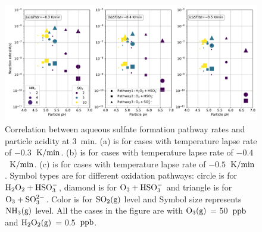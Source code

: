 \documentclass[edeposit,fullpage]{uiucthesis2009}
\makeatletter
\DeclareRobustCommand*\unit[1]
 {\ensuremath{%
   {\thinmuskip3mu\relax
    \def\mu{\text{\textmu}}\def~{\,}%
    \ifx\f@series\testbx\mathbf{#1}\else\mathrm{#1}\fi}}}
\makeatother
\begin{document}
\begin{figure}[ht]
    \centering \includegraphics[scale=0.55]{chap2_figs/chap2_fig6_sulfate_pH.pdf}
    \caption{Correlation between aqueous sulfate formation pathway rates and particle acidity at 3~min. (a) is for cases with temperature lapse rate of $-0.3$~\unit{K/min}. (b) is for cases with temperature lapse rate of $-0.4$~\unit{K/min}. (c) is for cases with temperature lapse rate of $-0.5$~\unit{K/min}. Symbol types are for different oxidation pathways: circle is for $\rm H_2O_2+ HSO_3^-$, diamond is for $\rm O_3+ HSO_3^-$ and triangle is for $\rm O_3+ SO_3^{2-}$. Color is for $\rm SO_2(g)$ level and Symbol size represents $\rm NH_3(g)$ level. All the cases in the figure are with $\rm O_3(g)$ = 50~\unit{ppb} and $\rm H_2O_2(g)$ = 0.5~\unit{ppb}.}
    \label{chap2:reac-rates}
\end{figure}

\end{document}
